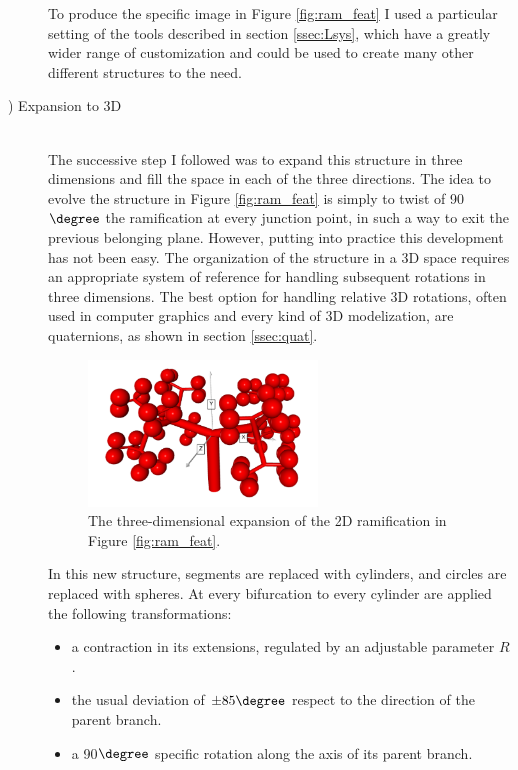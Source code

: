 \begin{description}
    To produce the specific image in Figure \ref{fig:ram_feat} I used a particular setting of the tools described in section \ref{ssec:Lsys}, which have a greatly wider range of customization and could be used to create many other different structures to the need.

    \item [\mycount) Expansion to 3D] \hfill \\
    The successive step I followed was to expand this structure in three dimensions and fill the space in each of the three directions. The idea to evolve the structure in Figure \ref{fig:ram_feat} is simply to twist of 90$\degree$ the ramification at every junction point, in such a way to exit the previous belonging plane. However, putting into practice this development has not been easy. The organization of the structure in a 3D space requires an appropriate system of reference for handling subsequent rotations in three dimensions. The best option for handling relative 3D rotations, often used in computer graphics and every kind of 3D modelization, are quaternions, as shown in section \ref{ssec:quat}.

    \begin{figure}
        \centering
        \includegraphics[width = 0.6\textwidth]{images/3d_ram}
        \caption{The three-dimensional expansion of the 2D ramification in Figure \ref{fig:ram_feat}.}
        \label{fig:3d_ram}
    \end{figure}

    In this new structure, segments are replaced with cylinders, and circles are replaced with spheres. At every bifurcation to every cylinder are applied the following transformations:
    \begin{itemize}
        \item a contraction in its extensions, regulated by an adjustable parameter $R$.
        \item the usual deviation of $\pm 85 \degree$ respect to the direction of the parent branch.
        \item a 90$\degree$ specific rotation along the axis of its parent branch.
    \end{itemize}


\end{description}
